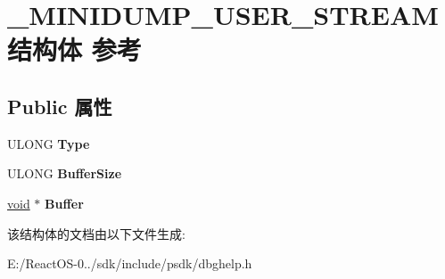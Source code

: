 \hypertarget{struct___m_i_n_i_d_u_m_p___u_s_e_r___s_t_r_e_a_m}{}\section{\+\_\+\+M\+I\+N\+I\+D\+U\+M\+P\+\_\+\+U\+S\+E\+R\+\_\+\+S\+T\+R\+E\+A\+M结构体 参考}
\label{struct___m_i_n_i_d_u_m_p___u_s_e_r___s_t_r_e_a_m}
\subsection*{Public 属性}
\begin{DoxyCompactItemize}
\item 
\mbox{\label{struct___m_i_n_i_d_u_m_p___u_s_e_r___s_t_r_e_a_m_a3db0723b7559e1d508f1369f60e1b51a}} 
U\+L\+O\+NG {\bfseries Type}
\item 
\mbox{\label{struct___m_i_n_i_d_u_m_p___u_s_e_r___s_t_r_e_a_m_ae6604d829845a2331982579eedbd456d}} 
U\+L\+O\+NG {\bfseries Buffer\+Size}
\item 
\mbox{\label{struct___m_i_n_i_d_u_m_p___u_s_e_r___s_t_r_e_a_m_ad13cfa4f4606314368dfe5e33a6a4137}} 
\hyperlink{interfacevoid}{void} $\ast$ {\bfseries Buffer}
\end{DoxyCompactItemize}


该结构体的文档由以下文件生成\+:\begin{DoxyCompactItemize}
\item 
E\+:/\+React\+O\+S-\/0../sdk/include/psdk/dbghelp.\+h\end{DoxyCompactItemize}
